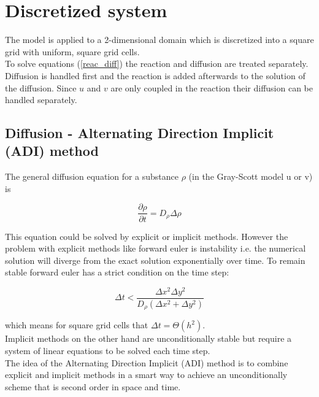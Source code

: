 \documentclass[11pt,a4paper]{article} %
\begin{document}
\section{Discretized system}

The model is applied to a 2-dimensional domain which is discretized into a square grid with uniform, square grid cells. \\

To solve equations (\ref{reac_diff}) the reaction and diffusion are treated separately.
Diffusion is handled first and the reaction is added afterwards to the solution of the diffusion.
Since $u$ and $v$ are only coupled in the reaction their diffusion can be handled separately.

\subsection{Diffusion - Alternating Direction Implicit (ADI) method}

The general diffusion equation for a substance $\rho$ (in the Gray-Scott model u or v) is

\begin{equation} \label{gen_diff}
\frac{\partial \rho}{\partial t} = D_\rho \Delta \rho
\end{equation}

This equation could be solved by explicit or implicit methods.
However the problem with explicit methods like forward euler is instability i.e. the numerical solution will diverge from the exact solution exponentially over time.
To remain stable forward euler has a strict condition on the time step:

\begin{equation} \label{stab_cond}
	\Delta t < \frac{ \Delta x^2 \Delta y^2}{D_{\rho} ( \Delta x^2 + \Delta y^2 ) }
\end{equation}

which means for square grid cells that $ \Delta t = \Theta (h^2) $. \\

Implicit methods on the other hand are unconditionally stable but require a system of linear equations to be solved each time step. \\

The idea of the Alternating Direction Implicit (ADI) method \cite{Craig_Sneyd_1988} is to combine explicit and implicit methods in a smart way to achieve an unconditionally scheme that is second order in space and time. 
\end{document}
